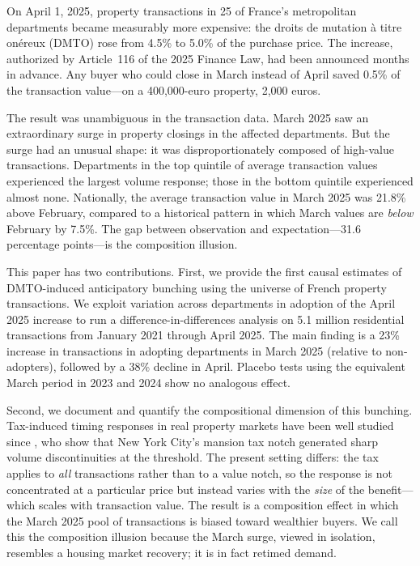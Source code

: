 \documentclass[12pt]{article}
\begin{document}
On April 1, 2025, property transactions in 25 of France's metropolitan departments became
measurably more expensive: the droits de mutation \`{a} titre on\'{e}reux (DMTO) rose from 4.5\%
to 5.0\% of the purchase price. The increase, authorized by Article~116 of the 2025 Finance Law,
had been announced months in advance. Any buyer who could close in March instead of April saved
0.5\% of the transaction value—on a 400,000-euro property, 2,000 euros.

The result was unambiguous in the transaction data. March 2025 saw an extraordinary surge in
property closings in the affected departments. But the surge had an unusual shape: it was
disproportionately composed of high-value transactions. Departments in the top quintile of
average transaction values experienced the largest volume response; those in the bottom quintile
experienced almost none. Nationally, the average transaction value in March 2025 was 21.8\%
above February, compared to a historical pattern in which March values are \textit{below}
February by 7.5\%. The gap between observation and expectation—31.6 percentage points—is the
composition illusion.

This paper has two contributions. First, we provide the first causal estimates of DMTO-induced
anticipatory bunching using the universe of French property transactions. We exploit variation across
departments in adoption of the April 2025 increase to run a difference-in-differences analysis on
5.1 million residential transactions from January 2021 through April 2025. The main finding is a
23\% increase in transactions in adopting departments in March 2025 (relative to non-adopters),
followed by a 38\% decline in April. Placebo tests using the equivalent March period in 2023 and
2024 show no analogous effect.

Second, we document and quantify the compositional dimension of this bunching. Tax-induced timing
responses in real property markets have been well studied since \citet{kopczuk2015}, who show that
New York City's mansion tax notch generated sharp volume discontinuities at the threshold. The
present setting differs: the tax applies to \textit{all} transactions rather than to a value notch,
so the response is not concentrated at a particular price but instead varies with the \textit{size}
of the benefit—which scales with transaction value. The result is a composition effect in which the
March 2025 pool of transactions is biased toward wealthier buyers. We call this the composition
illusion because the March surge, viewed in isolation, resembles a housing market recovery; it is
in fact retimed demand.
\end{document}
